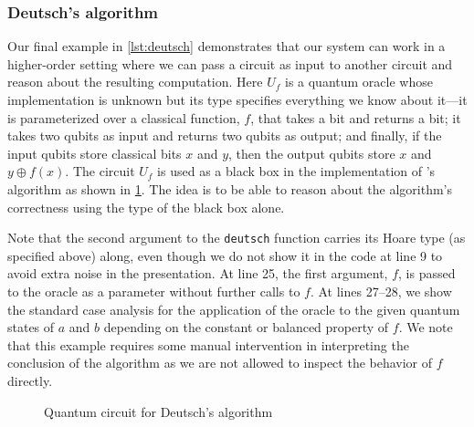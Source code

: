\subsubsection{Deutsch's algorithm}
Our final example in \cref{lst:deutsch} demonstrates that our system can work in a higher-order setting where we can pass a circuit as input to another circuit and reason about the resulting computation. Here $U_f$ is a quantum oracle whose implementation is unknown but its type specifies everything we know about it---it is parameterized over a classical function, $f$, that takes a bit and returns a bit; it takes two qubits as input and returns two qubits as output; and finally, if the input qubits store classical bits $x$ and $y$, then the output qubits store $x$ and $y \oplus f(x)$. The circuit $U_f$ is used as a black box in the implementation of \citeauthor{deutsch85}'s~\parencite*{deutsch85} algorithm as shown in \cref{fig:deutsch}. The idea is to be able to reason about the algorithm's correctness using the type of the black box alone.

Note that the second argument to the \texttt{deutsch} function carries its Hoare type (as specified above) along, even though we do not show it in the code at line 9 to avoid extra noise in the presentation. At line 25, the first argument, $f$, is passed to the oracle as a parameter without further calls to $f$. At lines 27--28, we show the standard case analysis for the application of the oracle to the given quantum states of $a$ and $b$ depending on the constant or balanced property of $f$. We note that this example requires some manual intervention in interpreting the conclusion of the algorithm as we are not allowed to inspect the behavior of $f$ directly.



\begin{figure}
    \centering
    \caption{Quantum circuit for Deutsch's algorithm}
    \label{fig:deutsch}
\end{figure}

